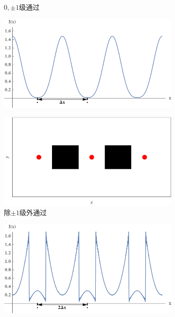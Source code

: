 \documentclass[a4paper]{article}
\begin{document}
\begin{figure}[H]
\begin{subfigure}[t]{0.4\textwidth}
        \caption{$0,\pm1$级通过}
        \label{fig3-3-5}
    \end{subfigure}
    \begin{subfigure}[t]{0.4\textwidth}
        \centering
        \includegraphics[width=\textwidth]{simu/Cimg.png}
        \caption{}
        \label{fig3-3-6}
    \end{subfigure}
    \begin{subfigure}[t]{0.4\textwidth}
        \centering
        \includegraphics[width=\textwidth]{simu/D.png}
        \caption{除$\pm1$级外通过}
        \label{fig3-3-7}
    \end{subfigure}
    \begin{subfigure}[t]{0.4\textwidth}
        \centering
        \includegraphics[width=\textwidth]{simu/Dimg.png}

\end{subfigure}
\end{figure}
\end{document}
